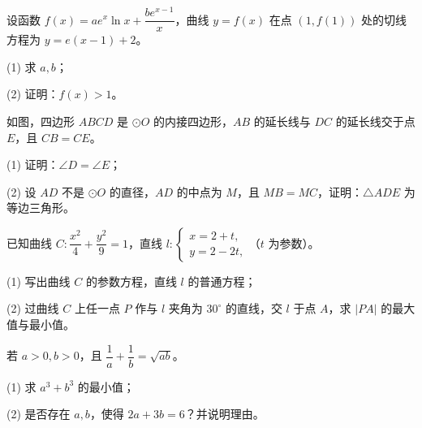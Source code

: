 \begin{question}
设函数 $f(x)=ae^x\ln x+\dfrac{be^{x-1}}x$，曲线 $y=f(x)$ 在点 $(1,f(1))$ 处的切线方程为 $y=e(x-1)+2$。

(1) 求 $a,b$；

(2) 证明：$f(x)>1$。

\Needspace{0.4\textheight}
\end{question}
\begin{question}
如图，四边形 $ABCD$ 是 $\odot O$ 的内接四边形，$AB$ 的延长线与 $DC$ 的延长线交于点 $E$，且 $CB=CE$。
\nopagebreak[4]
\begin{center}\end{center}
\nopagebreak[4]
(1) 证明：$\angle D=\angle E$；

(2) 设 $AD$ 不是 $\odot O$ 的直径，$AD$ 的中点为 $M$，且 $MB=MC$，证明：$\triangle ADE$ 为等边三角形。

\end{question}
\begin{question}
已知曲线 $C:\dfrac{x^2}{4}+\dfrac{y^2}{9}=1$，直线 $l:\begin{cases}x=2+t,\\y=2-2t,\end{cases}$（$t$ 为参数）。

(1) 写出曲线 $C$ 的参数方程，直线 $l$ 的普通方程；

(2) 过曲线 $C$ 上任一点 $P$ 作与 $l$ 夹角为 $30^\circ$ 的直线，交 $l$ 于点 $A$，求 $|PA|$ 的最大值与最小值。

\end{question}
\begin{question}
若 $a>0,b>0$，且 $\dfrac1a+\dfrac1b=\sqrt{ab}$。

(1) 求 $a^3+b^3$ 的最小值；

(2) 是否存在 $a,b$，使得 $2a+3b=6$？并说明理由。

\end{question}